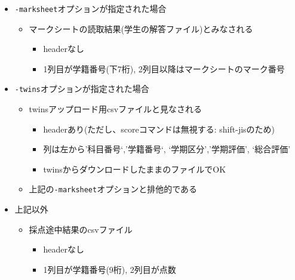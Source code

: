 \begin{itemize}
\item \texttt{-marksheet}オプションが指定された場合

\begin{itemize}
\item マークシートの読取結果(学生の解答ファイル)とみなされる

\begin{itemize}
\item headerなし

\item 1列目が学籍番号(下7桁), 2列目以降はマークシートのマーク番号

\end{itemize}

\end{itemize}

\item \texttt{-twins}オプションが指定された場合

\begin{itemize}
\item twinsアップロード用csvファイルと見なされる

\begin{itemize}
\item headerあり(ただし、scoreコマンドは無視する: shift-jisのため)

\item 列は左から'科目番号`,'学籍番号`, `学期区分','学期評価', `総合評価'

\item twinsからダウンロードしたままのファイルでOK

\end{itemize}

\item 上記の\texttt{-marksheet}オプションと排他的である

\end{itemize}

\item 上記以外

\begin{itemize}
\item 採点途中結果のcsvファイル

\begin{itemize}
\item headerなし

\item 1列目が学籍番号(9桁), 2列目が点数

\end{itemize}

\end{itemize}

\end{itemize}

